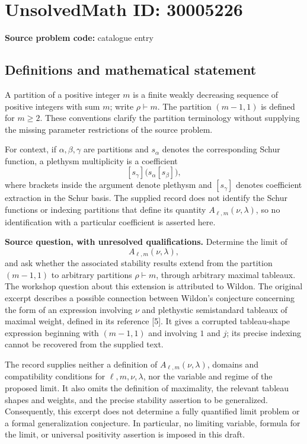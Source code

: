 \documentclass[11pt]{article}
\begin{document}
\section*{UnsolvedMath ID: 30005226}
\textbf{Source problem code:} catalogue entry
\subsection{Definitions and mathematical statement}
A partition of a positive integer \(m\) is a finite weakly decreasing sequence of positive integers with sum \(m\); write \(\rho\vdash m\). The partition \((m-1,1)\) is defined for \(m\geq 2\). These conventions clarify the partition terminology without supplying the missing parameter restrictions of the source problem.

For context, if \(\alpha,\beta,\gamma\) are partitions and \(s_\alpha\) denotes the corresponding Schur function, a plethysm multiplicity is a coefficient
\[
[s_\gamma]\bigl(s_\alpha[s_\beta]\bigr),
\]
where brackets inside the argument denote plethysm and \([s_\gamma]\) denotes coefficient extraction in the Schur basis. The supplied record does not identify the Schur functions or indexing partitions that define its quantity \(A_{\ell,m}(\nu,\lambda)\), so no identification with a particular coefficient is asserted here.

\textbf{Source question, with unresolved qualifications.} Determine the limit of
\[
A_{\ell,m}(\nu,\lambda),
\]
and ask whether the associated stability results extend from the partition \((m-1,1)\) to arbitrary partitions \(\rho\vdash m\), through arbitrary maximal tableaux. The workshop question about this extension is attributed to Wildon. The original excerpt describes a possible connection between Wildon's conjecture concerning the form of an expression involving \(\nu\) and plethystic semistandard tableaux of maximal weight, defined in its reference [5]. It gives a corrupted tableau-shape expression beginning with \((m-1,1)\) and involving \(1\) and \(j\); its precise indexing cannot be recovered from the supplied text.

The record supplies neither a definition of \(A_{\ell,m}(\nu,\lambda)\), domains and compatibility conditions for \(\ell,m,\nu,\lambda\), nor the variable and regime of the proposed limit. It also omits the definition of maximality, the relevant tableau shapes and weights, and the precise stability assertion to be generalized. Consequently, this excerpt does not determine a fully quantified limit problem or a formal generalization conjecture. In particular, no limiting variable, formula for the limit, or universal positivity assertion is imposed in this draft.
\end{document}
